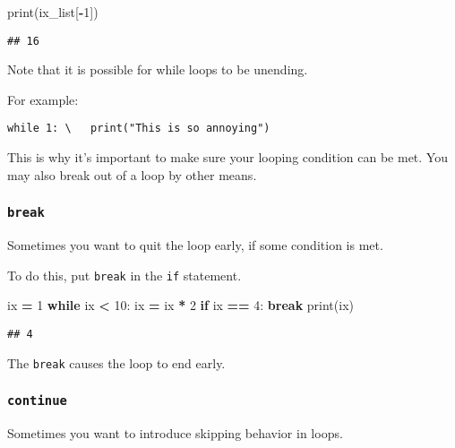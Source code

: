 \documentclass[
]{book}
\newenvironment{Shaded}{\begin{snugshade}}{\end{snugshade}}
\newcommand{\BuiltInTok}[1]{#1}
\newcommand{\ControlFlowTok}[1]{\textcolor[rgb]{0.13,0.29,0.53}{\textbf{#1}}}
\newcommand{\DecValTok}[1]{\textcolor[rgb]{0.00,0.00,0.81}{#1}}
\newcommand{\NormalTok}[1]{#1}
\newcommand{\OperatorTok}[1]{\textcolor[rgb]{0.81,0.36,0.00}{\textbf{#1}}}
\begin{document}
\begin{Shaded}
\begin{Highlighting}[]
\BuiltInTok{print}\NormalTok{(ix\_list[}\OperatorTok{{-}}\DecValTok{1}\NormalTok{])}
\end{Highlighting}
\end{Shaded}

\begin{verbatim}
## 16
\end{verbatim}

Note that it is possible for while loops to be unending.

For example:

\texttt{while\ 1:\ \textbackslash{}\ \ \ print("This\ is\ so\ annoying")}

This is why it's important to make sure your looping condition can be met. You may also break out of a loop by other means.

\subsubsection{\texorpdfstring{\texttt{break}}{break}}\label{break}

Sometimes you want to quit the loop early, if some condition is met.

To do this, put \texttt{break} in the \texttt{if} statement.

\begin{Shaded}
\begin{Highlighting}[]
\NormalTok{ix }\OperatorTok{=} \DecValTok{1}
\ControlFlowTok{while}\NormalTok{ ix }\OperatorTok{\textless{}} \DecValTok{10}\NormalTok{:}
\NormalTok{    ix }\OperatorTok{=}\NormalTok{ ix }\OperatorTok{*} \DecValTok{2}
    \ControlFlowTok{if}\NormalTok{ ix }\OperatorTok{==} \DecValTok{4}\NormalTok{:}
        \ControlFlowTok{break}
\BuiltInTok{print}\NormalTok{(ix)}
\end{Highlighting}
\end{Shaded}

\begin{verbatim}
## 4
\end{verbatim}

The \texttt{break} causes the loop to end early.

\subsubsection{\texorpdfstring{\texttt{continue}}{continue}}\label{continue}

Sometimes you want to introduce skipping behavior in loops.
\end{document}
